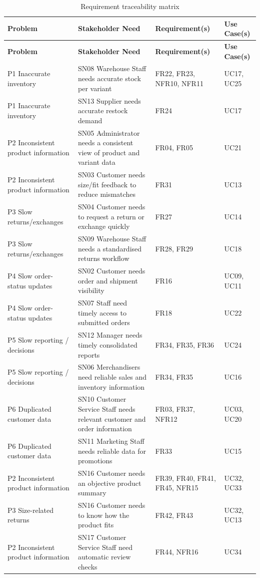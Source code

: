 \documentclass[11pt,a4paper,oneside]{extreport}
\newif\ifshowvtwo
\newcommand{\vtwocolor}{\ifshowvtwo\color{red}\fi}
\newcommand{\R}{\leavevmode\vtwocolor}   %
\begin{document}
{\small
\begin{xltabular}{\textwidth}{@{}L{3.0cm} Y L{2.6cm} L{1.7cm}@{}}
\caption{Requirement traceability matrix}\label{tab:trace}\\
\toprule
\textbf{Problem} & \textbf{Stakeholder Need} & \textbf{Requirement(s)} & \textbf{Use Case(s)} \\ \midrule
\endfirsthead
\toprule
\textbf{Problem} & \textbf{Stakeholder Need} & \textbf{Requirement(s)} & \textbf{Use Case(s)} \\ \midrule
\endhead
\bottomrule
\endlastfoot
P1 Inaccurate inventory & SN08 Warehouse Staff needs accurate stock per variant & FR22, FR23, NFR10, NFR11 & UC17, UC25 \\ \addlinespace
P1 Inaccurate inventory & SN13 Supplier needs accurate restock demand & FR24 & UC17 \\ \addlinespace
P2 Inconsistent product information & SN05 Administrator needs a consistent view of product and variant data & FR04, FR05 & UC21 \\ \addlinespace
P2 Inconsistent product information & SN03 Customer needs size/fit feedback to reduce mismatches & FR31 & UC13 \\ \addlinespace
P3 Slow returns/exchanges & SN04 Customer needs to request a return or exchange quickly & FR27 & UC14 \\ \addlinespace
P3 Slow returns/exchanges & SN09 Warehouse Staff needs a standardised returns workflow & FR28, FR29 & UC18 \\ \addlinespace
P4 Slow order-status updates & SN02 Customer needs order and shipment visibility & FR16 & UC09, UC11 \\ \addlinespace
P4 Slow order-status updates & SN07 Staff need timely access to submitted orders & FR18 & UC22 \\ \addlinespace
P5 Slow reporting / decisions & SN12 Manager needs timely consolidated reports & FR34, FR35, FR36 & UC24 \\ \addlinespace
P5 Slow reporting / decisions & SN06 Merchandisers need reliable sales and inventory information & FR34, FR35 & UC16 \\ \addlinespace
P6 Duplicated customer data & SN10 Customer Service Staff needs relevant customer and order information & FR03, FR37, NFR12 & UC03, UC20 \\ \addlinespace
P6 Duplicated customer data & SN11 Marketing Staff needs reliable data for promotions & FR33 & UC15 \\ \addlinespace
\R P2 Inconsistent product information & \R SN16 Customer needs an objective product summary & \R FR39, FR40, FR41, FR45, NFR15 & \R UC32, UC33 \\ \addlinespace
\R P3 Size-related returns & \R SN16 Customer needs to know how the product fits & \R FR42, FR43 & \R UC32, UC13 \\ \addlinespace
\R P2 Inconsistent product information & \R SN17 Customer Service Staff need automatic review checks & \R FR44, NFR16 & \R UC34 \\
\end{xltabular}
}
\end{document}
